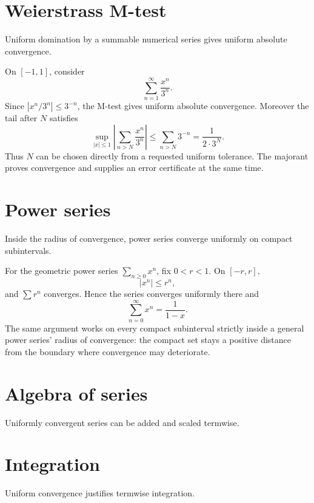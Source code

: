 \section{Weierstrass M-test}
Uniform domination by a summable numerical series gives uniform absolute convergence.


\begin{example}\label{ex:ii13-expand-01}
On \([-1,1]\), consider
\[
\sum_{n=1}^{\infty}\frac{x^n}{3^n}.
\]
Since \(|x^n/3^n|\le 3^{-n}\), the M-test gives uniform absolute convergence.
Moreover the tail after \(N\) satisfies
\[
\sup_{|x|\le1}\left|\sum_{n>N}\frac{x^n}{3^n}\right|
\le\sum_{n>N}3^{-n}
=\frac{1}{2\cdot3^N}.
\]
Thus \(N\) can be chosen directly from a requested uniform tolerance. The
majorant proves convergence and supplies an error certificate at the same time.
\end{example}
\section{Power series}
Inside the radius of convergence, power series converge uniformly on compact subintervals.


\begin{example}\label{ex:ii13-expand-02}
For the geometric power series \(\sum_{n\ge0}x^n\), fix \(0<r<1\). On
\([-r,r]\),
\[
|x^n|\le r^n,
\]
and \(\sum r^n\) converges. Hence the series converges uniformly there and
\[
\sum_{n=0}^{\infty}x^n=\frac1{1-x}.
\]
The same argument works on every compact subinterval strictly inside a general
power series' radius of convergence: the compact set stays a positive distance
from the boundary where convergence may deteriorate.
\end{example}
\section{Algebra of series}
Uniformly convergent series can be added and scaled termwise.

\section{Integration}
Uniform convergence justifies termwise integration.

